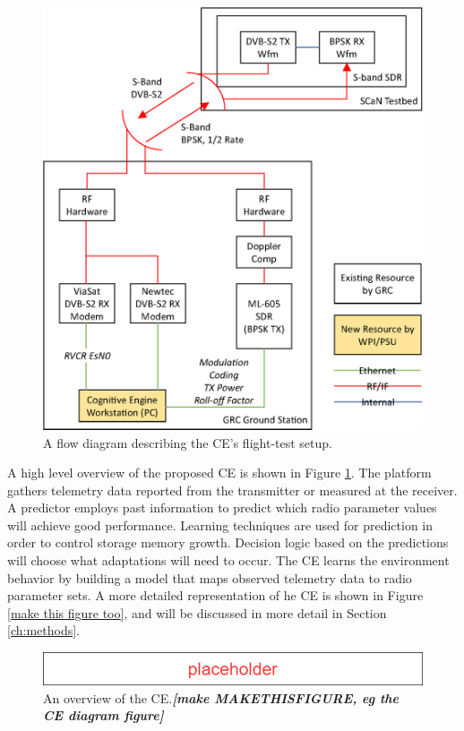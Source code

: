 	\begin{figure}
		\centering
		\caption{A flow diagram describing the CE's flight-test setup.}
		\label{fig:CE_outline}
		\includegraphics[scale=0.5]{figures/system_block_diagram.eps}
	\end{figure}
	
	\par A high level overview of the proposed CE is shown in Figure \ref{fig:CE_outline}. The platform gathers telemetry data reported from the transmitter or measured at the receiver. A predictor employs past information to predict which radio parameter values will achieve good performance. Learning techniques are used for prediction in order to control storage memory growth. Decision logic based on the predictions will choose what adaptations will need to occur. The CE learns the environment behavior by building a model that maps observed telemetry data to radio parameter sets. A more detailed representation of he CE is shown in Figure \ref{make this figure too}, and will be discussed in more detail in Section \ref{ch:methods}.
	\begin{figure}
		\centering
		\caption{An overview of the CE.\textit{\textbf{[make MAKETHISFIGURE, eg the CE diagram figure]}}}
		\label{bg:CEFigure}
		\includegraphics[scale=0.5]{figures/Placeholder.png}
	\end{figure}

